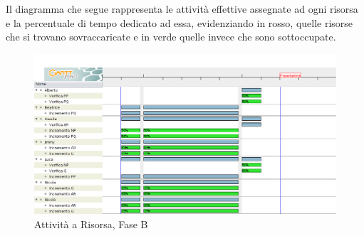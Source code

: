 Il diagramma che segue rappresenta le attività effettive assegnate ad ogni risorsa e la percentuale di tempo dedicato ad essa, evidenziando in rosso, quelle risorse che si trovano sovraccaricate e in verde quelle invece che sono sottoccupate.
\begin{landscape}
\begin{figure}[h]
	\centering
	\includegraphics[width=\linewidth]{./content/Immagini/Analisi_incrementaleR.png}
	\caption{Attività a Risorsa, Fase B}
\end{figure}
\end{landscape}
